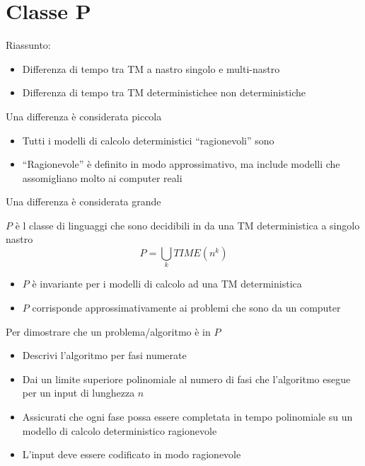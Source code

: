 \section{Classe P}
Riassunto: 
\begin{itemize}
  \item Differenza di tempo  tra TM a nastro singolo e multi-nastro
  \item Differenza di tempo  tra TM deterministichee non deterministiche
\end{itemize}
Una differenza  è considerata piccola
\begin{itemize}
  \item Tutti i modelli di calcolo deterministici ``ragionevoli'' sono 
  \item ``Ragionevole'' è definito in modo approssimativo, ma include
    modelli che assomigliano molto ai computer reali
\end{itemize}
Una differenza  è considerata grande
\begin{definition}
  $P$ è l classe di linguaggi che sono decidibili in 
  da una TM deterministica a singolo nastro
  \begin{displaymath}
    P=\underset{k}{\bigcup}TIME(n^k)
  \end{displaymath}
\end{definition}
\begin{itemize}
  \item $P$ è invariante per i modelli di calcolo 
    ad una TM deterministica
  \item $P$ corrisponde approssimativamente ai problemi che sono 
     da un computer
\end{itemize}
Per dimostrare che un problema/algoritmo è in $P$ 
\begin{itemize}
  \item Descrivi l'algoritmo per fasi numerate 
  \item Dai un limite superiore polinomiale al numero di fasi che l'algoritmo 
    esegue per un input di lunghezza $n$ 
  \item Assicurati che ogni fase possa essere completata in tempo polinomiale
    su un modello di calcolo deterministico ragionevole
  \item L'input deve essere codificato in modo ragionevole
\end{itemize}
